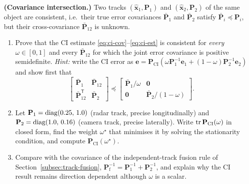 \begin{prob}\label{prob:ch03:8}
\textbf{(Covariance intersection.)} Two tracks $(\widehat{\mathbf{x}}_1,\mathbf{P}_1)$ and $(\widehat{\mathbf{x}}_2,\mathbf{P}_2)$ of the same object are consistent, i.e.\ their true error covariances $\bar{\mathbf{P}}_1$ and $\bar{\mathbf{P}}_2$ satisfy $\bar{\mathbf{P}}_i\preceq\mathbf{P}_i$, but their cross-covariance $\bar{\mathbf{P}}_{12}$ is unknown.
\begin{enumerate}
\item[(a)] Prove that the CI estimate \eqref{eq:ci-cov}--\eqref{eq:ci-est} is consistent for \emph{every} $\omega\in[0,1]$ and every $\bar{\mathbf{P}}_{12}$ for which the joint error covariance is positive semidefinite. \emph{Hint:} write the CI error as $\mathbf{e}=\mathbf{P}_{\mathrm{CI}}\left(\omega\mathbf{P}_1^{-1}\mathbf{e}_1+(1-\omega)\mathbf{P}_2^{-1}\mathbf{e}_2\right)$ and show first that
\begin{equation*}
\begin{bmatrix}\bar{\mathbf{P}}_1&\bar{\mathbf{P}}_{12}\\ \bar{\mathbf{P}}_{12}^{\mathsf T}&\bar{\mathbf{P}}_2\end{bmatrix}\preceq\begin{bmatrix}\bar{\mathbf{P}}_1/\omega&\mathbf{0}\\ \mathbf{0}&\bar{\mathbf{P}}_2/(1-\omega)\end{bmatrix}.
\end{equation*}
\item[(b)] Let $\mathbf{P}_1=\operatorname{diag}(0.25,\,1.0)$ (radar track, precise longitudinally) and $\mathbf{P}_2=\operatorname{diag}(1.0,\,0.16)$ (camera track, precise laterally). Write $\operatorname{tr}\mathbf{P}_{\mathrm{CI}}(\omega)$ in closed form, find the weight $\omega^{\star}$ that minimises it by solving the stationarity condition, and compute $\mathbf{P}_{\mathrm{CI}}(\omega^{\star})$.
\item[(c)] Compare with the covariance of the independent-track fusion rule of Section~\ref{subsec:track-fusion}, $\mathbf{P}_{\mathrm{f}}^{-1}=\mathbf{P}_1^{-1}+\mathbf{P}_2^{-1}$, and explain why the CI result remains direction dependent although $\omega$ is a scalar.
\end{enumerate}
\end{prob}

